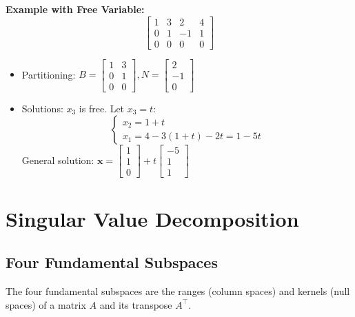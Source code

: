 \documentclass{article}
\begin{document}
\textbf{Example with Free Variable:}
\begin{equation*}
\left[\begin{array}{ccc|c}
1 & 3 & 2 & 4 \\
0 & 1 & -1 & 1 \\
0 & 0 & 0 & 0
\end{array}\right]
\end{equation*}
\begin{itemize}
    \item Partitioning: \( B = \begin{bmatrix} 1 & 3 \\ 0 & 1 \\ 0 & 0 \end{bmatrix}, N = \begin{bmatrix} 2 \\ -1 \\ 0 \end{bmatrix} \)
    \item Solutions: \( x_3 \) is free. Let \( x_3 = t \):
    \[
    \begin{cases}
    x_2 = 1 + t \\
    x_1 = 4 - 3(1 + t) - 2t = 1 - 5t
    \end{cases}
    \]
    General solution: \( \mathbf{x} = \begin{bmatrix} 1 \\ 1 \\ 0 \end{bmatrix} + t\begin{bmatrix} -5 \\ 1 \\ 1 \end{bmatrix} \)
\end{itemize}

\vspace{1.2cm}

\date{\today}
\vspace{1.2cm}

\section{Singular Value Decomposition}
\subsection*{Four Fundamental Subspaces}
The four fundamental subspaces are the ranges (column spaces) and kernels (null spaces) of a matrix \( A \) and its transpose \( A^\top \).
\end{document}
